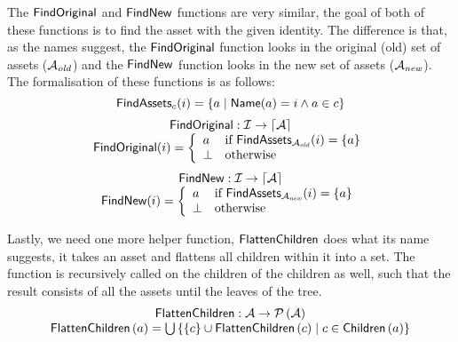 The \({\sf FindOriginal}\) and \({\sf FindNew}\) functions are very similar, the goal
of both of these functions is to find the asset with the given identity.
The difference is that, as the names suggest, the \({\sf FindOriginal}\) function
looks in the original (old) set of assets (\(\mathcal{A}_{\it old}\)) and the
\({\sf FindNew}\) function looks in the new set of assets (\(\mathcal{A}_{\it new}\)). The
formalisation of these functions is as follows:
\[
  {\sf FindAssets}_c(i) = \left\{a \hspace*{1mm}\middle|\hspace*{1mm} {\sf Name}(a) = i \land a \in c \right\}
\]
\[
  \begin{array}{c}
    {\sf FindOriginal} : \mathcal{I} \rightarrow \lceil \mathcal{A} \rceil \\ 
    {\sf FindOriginal}(i) = \left\{
      \begin{array}{ll}
        a & \text{if } {\sf FindAssets}_{\mathcal{A}_{\it old}}(i) = \left\{ a \right\} \\
        \bot & \text{otherwise}
      \end{array}
    \right.
  \end{array}
\]
\[
  \begin{array}{c}
    {\sf FindNew} : \mathcal{I} \rightarrow \lceil \mathcal{A} \rceil \\
    {\sf FindNew}(i) = \left\{
      \begin{array}{ll}
        a & \text{if } {\sf FindAssets}_{\mathcal{A}_{\it new}}(i) = \left\{ a \right\} \\
        \bot & \text{otherwise}
      \end{array}
    \right.
  \end{array}
\]

Lastly, we need one more helper function, \({\sf FlattenChildren}\) does what
its name suggests, it takes an asset and flattens all children within it into a
set. The function is recursively called on the children of the children as
well, such that the result consists of all the assets until the leaves of the
tree.
\[
  \begin{array}{c}
    {\sf FlattenChildren} : \mathcal{A} \rightarrow \mathcal{P} \left(\mathcal{A}\right) \\
    {\sf FlattenChildren}\left(a\right) = \bigcup \left\{ \left\{ c \right\} \cup {\sf FlattenChildren}\left(c\right) \hspace*{1mm}\middle|\hspace*{1mm} c \in {\sf Children}\left(a\right)\right\}
  \end{array}
\]

